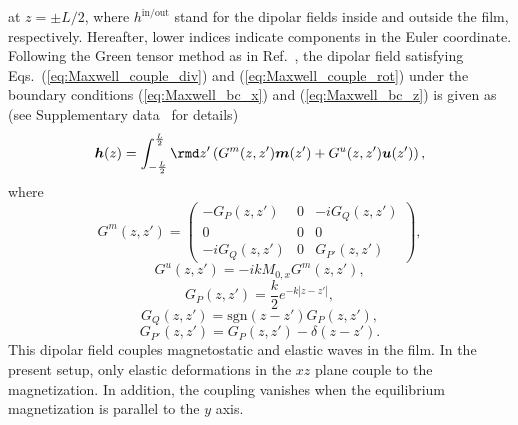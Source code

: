 \documentclass[10pt]{iopart}
\begin{document}
at $z=\pm L/2$, where $h^{\mathrm{in}/\mathrm{out}}$ stand for the dipolar fields inside and outside the film, respectively. Hereafter, lower indices indicate components in the Euler coordinate. Following the Green tensor method as in Ref.~\cite{Kalinikos_Slavin_1986}, the dipolar field satisfying Eqs.~(\ref{eq:Maxwell_couple_div}) and (\ref{eq:Maxwell_couple_rot}) under the boundary conditions (\ref{eq:Maxwell_bc_x}) and (\ref{eq:Maxwell_bc_z}) is given as (see Supplementary data~\cite{SM} for details)
\begin{equation}
    \bm{h}(z)=\int_{-\frac{L}{2}}^{\frac{L}{2}}\rmd z'\left(G^m(z,z')\bm{m}(z')+G^u(z,z')\bm{u}(z')\right),\label{eq:dipolar_field}
\end{equation}
where
\begin{equation}
    G^m(z,z')=\left(\begin{array}{ccc}
        -G_P(z,z')&0&-iG_Q(z,z')\\
        0&0&0\\
        -iG_Q(z,z')&0&G_{P'}(z,z')
    \end{array}\right),
\end{equation}
\begin{equation*}
    G^u(z,z')=-ikM_{0,x}G^m(z,z'),
\end{equation*}
\begin{equation}
    G_{P}(z,z')=\frac{k}{2}e^{-k|z-z'|},
\end{equation}
\begin{equation}
    G_{Q}(z,z')=\mathrm{sgn}(z-z')G_{P}(z,z'),
\end{equation}
\begin{equation}
    G_{P'}(z,z')=G_{P}(z,z')-\delta(z-z').
\end{equation}
This dipolar field couples magnetostatic and elastic waves in the film. In the present setup, only elastic deformations in the $xz$ plane couple to the magnetization. In addition, the coupling vanishes when the equilibrium magnetization is parallel to the $y$ axis.
\end{document}
